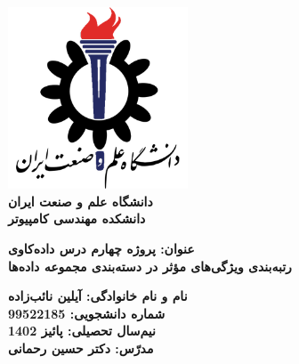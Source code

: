 \begin{titlepage}
\begin{center}
\includegraphics[width=0.4\textwidth]{IUSTLogo.png}\\
        
\LARGE
\textbf{دانشگاه علم و صنعت ایران}\\
\textbf{دانشکده مهندسی کامپیوتر}\\
        
\vfill
        
\huge
\textbf{عنوان: پروژه چهارم درس داده‌کاوی}\\
\textbf{رتبه‌بندی ویژگی‌های مؤثر در دسته‌بندی مجموعه داده‌ها}\\
\vfill
        
\LARGE
\textbf{نام و نام خانوادگی: آیلین نائب‌زاده }\\
\textbf{شماره دانشجویی: 99522185}\\
\textbf{نیم‌سال تحصیلی: پائیز 1402}\\
\textbf{مدرّس: دکتر حسین رحمانی}\\
\end{center}
\end{titlepage}
